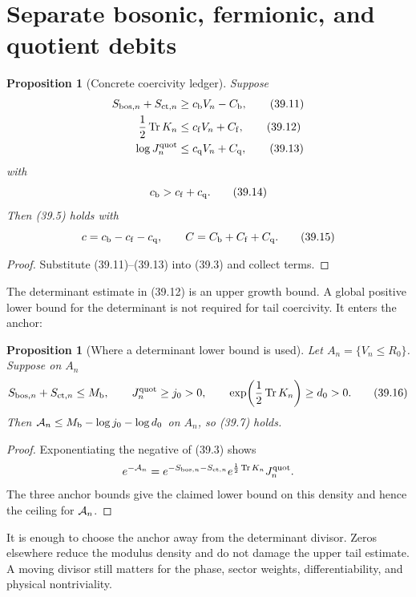 \documentclass[11pt]{article}
\newtheorem{proposition}[theorem]{Proposition}
\theoremstyle{remark}
\begin{document}
\section{Separate bosonic, fermionic, and quotient debits}

\begin{proposition}[Concrete coercivity ledger]
\label{prop:v15v39-ledger}
Suppose
\begin{align}
 S_{{\rm bos},n}+S_{{\rm ct},n}
 &\geq c_{\rm b}V_n-C_{\rm b},                           \tag{39.11}\\
 \frac12\operatorname{Tr}K_n
 &\leq c_{\rm f}V_n+C_{\rm f},                           \tag{39.12}\\
 \log J_n^{\rm quot}
 &\leq c_{\rm q}V_n+C_{\rm q},                           \tag{39.13}
\end{align}
with
\[
 c_{\rm b}>c_{\rm f}+c_{\rm q}.                         \tag{39.14}
\]
Then (39.5) holds with
\[
 c=c_{\rm b}-c_{\rm f}-c_{\rm q},\qquad
 C=C_{\rm b}+C_{\rm f}+C_{\rm q}.                       \tag{39.15}
\]
\end{proposition}

\begin{proof}
Substitute (39.11)--(39.13) into (39.3) and collect terms.
\end{proof}

The determinant estimate in (39.12) is an upper growth bound.  A
global positive lower bound for the determinant is not required for
tail coercivity.  It enters the anchor:

\begin{proposition}[Where a determinant lower bound is used]
\label{prop:v15v39-anchor-det}
Let \(A_n=\{V_n\leq R_0\}\).  Suppose on \(A_n\)
\[
 S_{{\rm bos},n}+S_{{\rm ct},n}\leq M_{\rm b},\qquad
 J_n^{\rm quot}\geq j_0>0,\qquad
 \exp\!\left(\frac12\operatorname{Tr}K_n\right)
 \geq d_0>0.                                             \tag{39.16}
\]
Then \({\cal A}_n\leq
M_{\rm b}-\log j_0-\log d_0\) on \(A_n\), so (39.7) holds.
\end{proposition}

\begin{proof}
Exponentiating the negative of (39.3) shows
\[
 e^{-{\cal A}_n}
 =e^{-S_{{\rm bos},n}-S_{{\rm ct},n}}
  e^{\frac12\operatorname{Tr}K_n}J_n^{\rm quot}.
\]
The three anchor bounds give the claimed lower bound on this density
and hence the ceiling for \({\cal A}_n\).
\end{proof}

It is enough to choose the anchor away from the determinant divisor.
Zeros elsewhere reduce the modulus density and do not damage the
upper tail estimate.  A moving divisor still matters for the phase,
sector weights, differentiability, and physical nontriviality.
\end{document}
